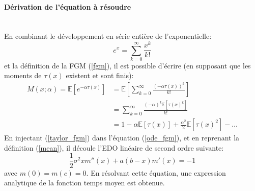 \paragraph{Dérivation de l'équation à résoudre}\phantom{}\\
En combinant le développement en série entière de l'exponentielle: 
\[
e^x=\sum_{k=0}^\infty\frac{x^k}{k!}
\]
et la définition de la \acl{FGM} (\ref{fgm}), il est possible d'écrire (en supposant que les moments de $\tau(x)$ existent et sont finis): 
\begin{equation}\label{taylor_fgm}
    \begin{aligned}
        M(x;\alpha)=\mathds{E}\left[e^{-\alpha \tau(x)}\right]&=\mathds{E}\left[\sum_{k=0}^\infty\frac{{(-\alpha\tau(x))}^k}{k!}\right] \\
        &= \sum_{k=0}^\infty\frac{{(-\alpha)}^k\mathds{E}\left[{\tau(x)}^k\right]}{k!}\\
        &=1-\alpha\mathds{E}[\tau(x)]+\frac{\alpha^2}{2}\mathds{E}\left[{\tau(x)}^2\right]-\ldots
    \end{aligned}
\end{equation}
En injectant (\ref{taylor_fgm}) dans l'équation (\ref{ode_fgm}), et en reprenant la définition (\ref{mean}), il découle l'\acs{EDO} linéaire de second ordre suivante: 
\begin{equation}\label{ode_mean}
    \frac{1}{2}\sigma^2xm''(x)+a(b-x)m'(x)=-1   
\end{equation}
avec $m(0)=m(c)=0$. En résolvant cette équation, une expression analytique de la fonction temps moyen est obtenue. 

